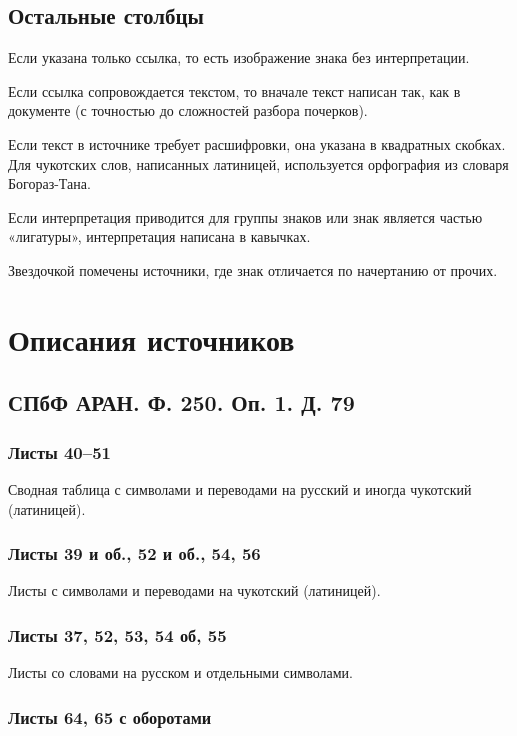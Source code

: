 \documentclass{article}
\begin{document}
\subsection{Остальные столбцы}

Если указана только ссылка, то есть изображение знака без интерпретации.

Если ссылка сопровождается текстом, то вначале текст написан так, как в документе (с точностью до сложностей разбора почерков). 

Если текст в источнике требует расшифровки, она указана в квадратных скобках. Для чукотских слов, написанных латиницей, используется орфография из словаря Богораз-Тана\cite{bogoraz1937}.

Если интерпретация приводится для группы знаков или знак является частью «лигатуры», интерпретация написана в кавычках.

Звездочкой помечены источники, где знак отличается по начертанию от прочих.

\section{Описания источников} 

\subsection{СПбФ АРАН. Ф. 250. Оп. 1. Д. 79}

\subsubsection{Листы 40–51}

Сводная таблица с символами и переводами на русский и иногда чукотский (латиницей).

\subsubsection{Листы 39 и об., 52 и об., 54, 56}

Листы с символами и переводами на чукотский (латиницей).

\subsubsection{Листы 37, 52, 53, 54 об, 55}

Листы со словами на русском и отдельными символами.

\subsubsection{Листы 64, 65 с оборотами}
\end{document}
